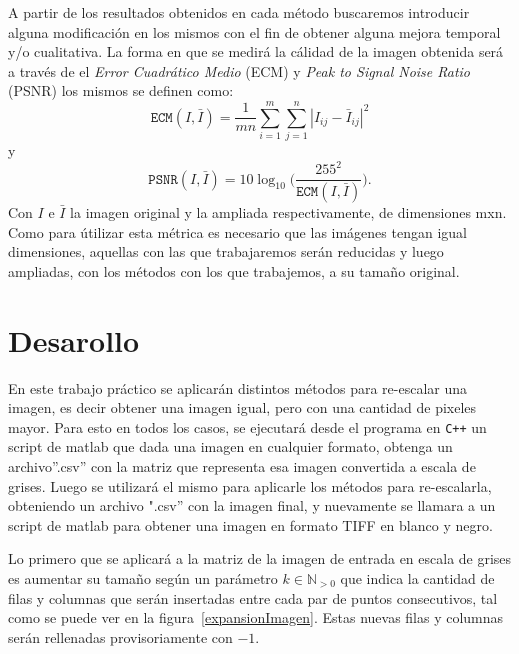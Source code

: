 \documentclass[a4paper]{article}
\newcounter{col}
\begin{document}
A partir de los resultados obtenidos en cada método buscaremos introducir alguna modificación en los mismos con el fin de obtener alguna mejora temporal y/o cualitativa. La forma en que se medirá la cálidad de la imagen obtenida será a través de el \emph{Error Cuadr\'atico Medio} (ECM) y \emph{Peak to Signal Noise Ratio} (PSNR) los mismos se definen como:
\begin{equation}
\texttt{ECM}(I,\bar{I}) = \frac{1}{mn}\sum_{i=1}^m\sum_{j = 1}^n |I_{ij} - \bar{I}_{ij}|^2 \label{eq:ecm}
\end{equation}
\noindent y
\begin{equation}
\texttt{PSNR}(I,\bar{I}) = 10 \log_{10}\bigg(\frac{255^2}{\texttt{ECM}(I,\bar{I})}\bigg). \label{eq:psnr}
\end{equation}  
Con $I$ e $\bar{I}$ la imagen original y la ampliada respectivamente, de dimensiones mxn. Como para útilizar esta métrica es necesario que las imágenes tengan igual dimensiones, aquellas con las que trabajaremos serán reducidas y luego ampliadas, con los métodos con los que trabajemos, a su tamaño original. 


\newpage 

\section{Desarollo}

En este trabajo pr\'actico se aplicar\'an distintos métodos para re-escalar una imagen, es decir obtener una imagen igual, pero con una cantidad de pixeles mayor. Para esto en todos los casos, se ejecutar\'a desde el programa en \verb-C++- un script de matlab que dada una imagen en cualquier formato, obtenga un archivo''.csv'' con la matriz que representa esa imagen convertida a escala de grises. Luego se utilizar\'a el mismo para aplicarle los métodos para re-escalarla, obteniendo un archivo ".csv'' con la imagen final, y nuevamente se llamara a un script de matlab para obtener una imagen en formato TIFF en blanco y negro.

Lo primero que se aplicar\'a a la matriz de la imagen de entrada en escala de grises es aumentar su tamaño según un parámetro $k \in \mathbb{N}_{>0}$ que indica la cantidad de filas y columnas que ser\'an insertadas entre cada par de puntos consecutivos, tal como se puede ver en la figura~\ref{expansionImagen}. Estas nuevas filas y columnas serán rellenadas provisoriamente con $ -1 $.
\end{document}
